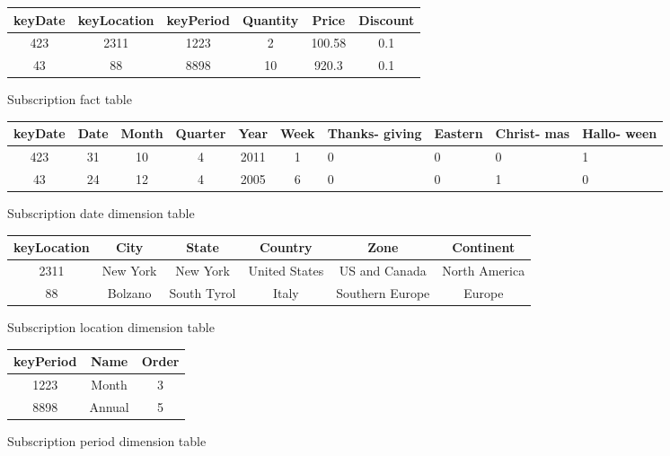 \begin{figure}[!hbp]
\caption{\label{t:f_sub}Subscription fact table}
\begin{center}
\begin{tabular}{|c|c|c|c|c|c|}
\hline
keyDate & keyLocation & keyPeriod & Quantity & Price & Discount\\
\hline
\hline
423 & 2311 & 1223 & 2 & 100.58 & 0.1\\
43 & 88 & 8898 & 10 & 920.3 & 0.1\\
\hline
\end{tabular}
\end{center}
\end{figure}

\begin{figure}[!hbp]
\caption{\label{t:sub_date}Subscription date dimension table}
\begin{center}
\begin{tabular}{|c|c|c|c|c|c|p{1.3cm}|p{1.2cm}|p{1.3cm}|p{1cm}|}
\hline 
keyDate &Date&Month&Quarter& Year & Week & Thanks- giving & Eastern & Christ- mas & Hallo- ween\\
\hline
\hline
423 & 31 & 10 & 4 & 2011 & 1 & 0 & 0 & 0 & 1\\
43 & 24 & 12 & 4 & 2005 & 6 & 0 & 0 & 1 & 0\\
\hline
\end{tabular}
\end{center}
\end{figure}


\begin{figure}[!hbp]
\caption{\label{t:sub_loc|}Subscription location dimension table}
\begin{center}
\begin{tabular}{|c|c|c|c|c|c|}
\hline
keyLocation & City & State & Country & Zone & Continent\\
\hline
\hline
2311 & New York & New York & United States & US and Canada & North America\\
88 & Bolzano & South Tyrol & Italy & Southern Europe & Europe\\
\hline
\end{tabular}
\end{center}
\end{figure}

\begin{figure}[!hbp]
\caption{\label{t:sub_per}Subscription period dimension table}
\begin{center}
\begin{tabular}{|c|c|c|}
\hline
keyPeriod & Name & Order\\
\hline
\hline
1223 & Month& 3\\
8898 & Annual& 5\\
\hline
\end{tabular}
\end{center}
\end{figure}

